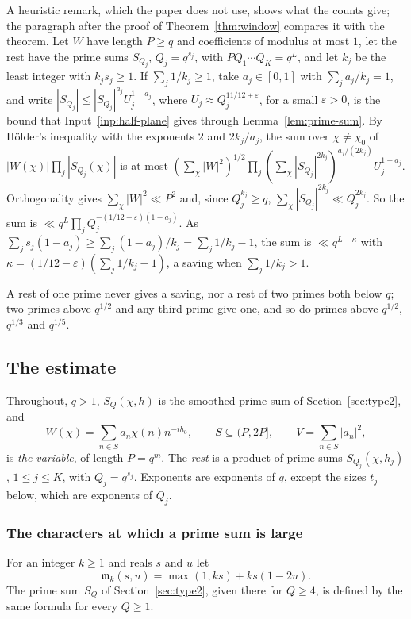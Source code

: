 \documentclass[11pt]{article}
\theoremstyle{definition}
\begin{document}
A heuristic remark, which the paper does not use, shows what the counts give; the paragraph after the proof of
Theorem~\ref{thm:window} compares it with the theorem. Let $W$ have length $P \ge q$ and coefficients of modulus at
most $1$, let the rest have the prime sums
$S_{Q_j}$, $Q_j = q^{s_j}$, with $P Q_1 \cdots Q_K = q^L$, and let $k_j$ be the least integer with $k_j s_j \ge 1$. If
$\sum_j 1/k_j \ge 1$, take $a_j \in [0, 1]$ with $\sum_j a_j/k_j = 1$, and write $|S_{Q_j}| \le |S_{Q_j}|^{a_j} U_j^{1 -
a_j}$, where $U_j \approx Q_j^{11/12 + \varepsilon}$, for a small $\varepsilon > 0$, is the bound that
Input~\ref{inp:half-plane} gives through Lemma~\ref{lem:prime-sum}. By H\"older's inequality with the exponents $2$ and
$2k_j/a_j$, the sum over $\chi \ne \chi_0$ of $|W(\chi)| \prod_j |S_{Q_j}(\chi)|$ is at most $(\sum_\chi |W|^2)^{1/2}
\prod_j (\sum_\chi |S_{Q_j}|^{2k_j})^{a_j/(2k_j)} U_j^{1 - a_j}$. Orthogonality gives $\sum_\chi |W|^2 \ll P^2$ and,
since $Q_j^{k_j} \ge q$, $\sum_\chi |S_{Q_j}|^{2k_j} \ll Q_j^{2k_j}$. So the sum is $\ll q^L \prod_j Q_j^{-(1/12 -
\varepsilon)(1 - a_j)}$. As $\sum_j s_j(1 - a_j) \ge \sum_j (1 - a_j)/k_j = \sum_j 1/k_j - 1$, the sum is $\ll q^{L -
\kappa}$ with $\kappa = (1/12 - \varepsilon)(\sum_j 1/k_j - 1)$, a saving when $\sum_j 1/k_j > 1$.

A rest of one prime never gives a saving, nor a rest of two primes both below $q$; two primes above $q^{1/2}$ and any
third prime give one, and so do primes above $q^{1/2}$, $q^{1/3}$ and $q^{1/5}$.

\subsection{The estimate}\label{sec:window-estimate}

Throughout, $q > 1$, $S_Q(\chi, h)$ is the smoothed prime sum of Section~\ref{sec:type2}, and
\[
  W(\chi) = \sum_{n \in S} a_n \chi(n) n^{-ih_0}, \qquad S \subseteq (P, 2P], \qquad V = \sum_{n \in S} |a_n|^2,
\]
is \emph{the variable}, of length $P = q^m$. The \emph{rest} is a product of prime sums $S_{Q_j}(\chi, h_j)$, $1 \le j
\le K$, with $Q_j = q^{s_j}$. Exponents are exponents of $q$, except the sizes $t_j$ below, which are exponents of
$Q_j$.

\subsubsection*{The characters at which a prime sum is large}

For an integer $k \ge 1$ and reals $s$ and $u$ let
\[
  \mathfrak m_k(s, u) = \max(1, ks) + ks(1 - 2u).
\]
The prime sum $S_Q$ of Section~\ref{sec:type2}, given there for $Q \ge 4$, is defined by the same formula for every
$Q \ge 1$.
\end{document}
